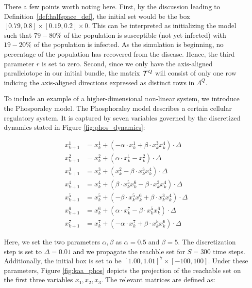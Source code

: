 \begin{example}
  There a few points worth noting here. First, by the discussion leading to Definition~\ref{def:halfspace_def}, the initial set would be the box $[0.79,0.8] \times [0.19, 0.2] \times 0$. This can be interpreted as initializing the model such that $79-80\%$ of the population is susceptible (not yet infected) with $19-20\%$ of the population is infected. As the simulation is beginning, no percentage of the population has recovered from the disease. Hence, the third parameter $r$ is set to zero.
  Second, since we only have the axis-aligned parallelotope in our initial bundle, the matrix $\mathcal{T}^Q$ will consist of only one row indicing the axis-aligned directions expressed as distinct rows in $\Lambda^Q$.
\end{example}

\begin{example}
To include an example of a higher-dimensional non-linear system, we introduce the Phosporaley model. The Phosphoraley model describes a certain cellular regulatory system. It is captured by seven variables governed by the discretized dynamics stated in Figure \ref{fig:phos_dynamics}:

\begin{center}
  \begin{equation*}
    \begin{split}
        x^1_{k+1} &= x^1_k + ( -\alpha \cdot x^1_k + \beta \cdot x^3_k x^4_k)\cdot \Delta \\
        x^2_{k+1} &= x^2_k + (  \alpha\cdot  x^1_k - x^2_k)\cdot \Delta \\
        x^3_{k+1} &= x^3_k + ( x^2_k - \beta \cdot x^3_k x^4_k)\cdot \Delta \\
        x^4_{k+1} &= x^4_k + ( \beta \cdot x^5_k x^6_k - \beta \cdot x^3_k x^4_k)\cdot \Delta \\
        x^5_{k+1} &= x^5_k + ( -\beta \cdot x^5_k x^6_k + \beta \cdot x^3_k x^4_k)\cdot \Delta \\
        x^6_{k+1} &= x^6_k + ( \alpha\cdot  x^7_k - \beta \cdot x^5_k x^6_k)\cdot \Delta \\
        x^7_{k+1} &= x^7_k + ( -\alpha\cdot  x^7_k + \beta \cdot  x^5_k x^6_k)\cdot \Delta
    \end{split}
  \end{equation*}
  \label{fig:phos_dynamics}
\end{center}
%
Here, we set the two parameters $\alpha,\beta$ as $\alpha=0.5$ and $\beta=5$. The discretization step is set to $\Delta =0.01$ and we propagate the reachble set for $S=300$ time steps. Additionally, the initial box is set to be $[1.00,1.01]^7 \times [-100, 100]$. Under these parameters, Figure \ref{fig:kaa_phos} depicts the projection of the reachable set on the first three variables $x_1, x_2, x_3$. The relevant matrices are defined as:


\end{example}
